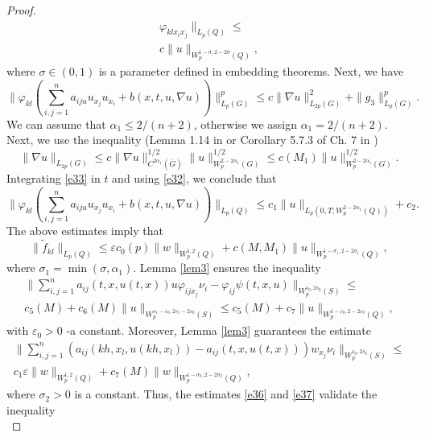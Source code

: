 \documentclass{article}
\theoremstyle{plain}
\begin{document}
\begin{proof}
\begin{multline}
 \varphi_{kl x_ix_j}\|_{L_p(Q)}\leq \\
 c\|u\|_{W_p^{1-\sigma,2-2\sigma}(Q)}, 
\end{multline} 
 where $\sigma\in (0,1)$ is a parameter defined in embedding theorems.  Next, we have
\begin{equation}\label{e33}
\|\varphi_{kl}(\sum_{i,j=1}^n a_{iju}u_{x_j}u_{x_i}+ b(x,t,u,\nabla u))\|_{L_p(G)}^p\leq c \| \nabla u \|_{L_{2p}(G)}^{2}+ \|g_3\|_{L_p(G)}^p. 
\end{equation} 
We can assume that  $\alpha_1\leq 2/(n+2)$, otherwise we assign  $\alpha_1=2/(n+2)$. 
 Next, we use the inequality  (Lemma  1.14 in \cite{pya11} or Corollary  5.7.3 of Ch. 7 in  \cite{ama})
 $$
 \| \nabla u \|_{L_{2p}(G)}\leq c \| \nabla u \|_{C^{2\alpha_1}(\overline{G})}^{1/2} \|u\|_{W_p^{2-2\alpha_1}(G)}^{1/2}\leq c(M_1) \|u\|_{W_p^{2-2\alpha_1}(G)}^{1/2}.
 $$
 Integrating  \eqref{e33} in $t$ and using  \eqref{e32}, we conclude that 
\begin{equation}\label{e34}
\|\varphi_{kl}(\sum_{i,j=1}^n a_{iju}u_{x_j}u_{x_i}+ b(x,t,u,\nabla u))\|_{L_p(Q)}\leq c_1 \|u \|_{L_p(0,T;W_p^{2-2\alpha_1}(Q))}+ c_2. 
\end{equation} 
The above estimates imply that 
\begin{equation}\label{e35}
\|\tilde{f}_{kl}\|_{L_p(Q)}\leq \varepsilon c_0(p) \|w\|_{W_p^{1,2}(Q)} + c(M,M_1) \|u \|_{W_p^{1-\sigma_1,2-2\sigma_1}(Q)},
\end{equation} 
where  $\sigma_1=\min(\sigma, \alpha_1)$. 
Lemma  \ref{lem3} ensures the inequality 
\begin{multline}\label{e36} 
 \|\sum_{i,j=1}^n a_{ij}(t,x,u(t,x)) u\varphi _{ijx_j}\nu_i- \varphi_{ij} \psi(t,x,u)\|_{W_p^{s_0,2s_0}(S)}\leq \\  c_5(M)+ c_6(M)\|u\|_{W_p^{s_1-\varepsilon_0, 2s_1-2\varepsilon_0}(S)}\leq
 c_5(M)+ c_7 \|u\|_{W_p^{1-\varepsilon_0, 2-2\varepsilon_0}(Q)},
\end{multline}  
with $\varepsilon_0>0$ -a constant.
Moreover, Lemma  \ref{lem3} guarantees the estimate
\begin{multline}\label{e37} 
\|\sum_{i,j=1}^n (a_{ij}(kh,x_l,u(kh,x_l))-a_{ij}(t,x,u(t,x)))w_{x_j}\nu_i\|_{W_p^{s_0,2s_0}(S)}\leq \\ c_1\varepsilon \|w\|_{W_p^{1,2}(Q)} +
c_7(M)  \|w\|_{W_p^{1-\sigma_2,2-2\sigma_2}(Q)},
\end{multline}   
 where $\sigma_2>0$ is a constant. 
 Thus, the estimates  \eqref{e36} and \eqref{e37} validate the inequality 
\begin{equation}\label{e38}

\end{equation}
\end{proof}
\end{document}
